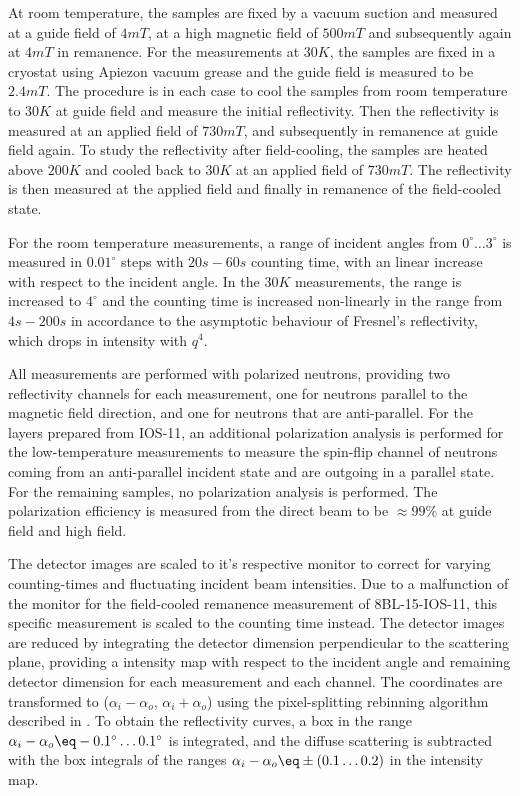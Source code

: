 \documentclass[\main/dresen_thesis.tex]{subfiles}
\begin{document}
    At room temperature, the samples are fixed by a vacuum suction and measured at a guide field of $4 \unit{mT}$, at a high magnetic field of $500 \unit{mT}$ and subsequently again at $4 \unit{mT}$ in remanence.
    For the measurements at $30 \unit{K}$, the samples are fixed in a cryostat using Apiezon vacuum grease and the guide field is measured to be $2.4 \unit{mT}$.
    The procedure is in each case to cool the samples from room temperature to $30 \unit{K}$ at guide field and measure the initial reflectivity.
    Then the reflectivity is measured at an applied field of $730 \unit{mT}$, and subsequently in remanence at guide field again.
    To study the reflectivity after field-cooling, the samples are heated above $200 \unit{K}$ and cooled back to $30 \unit{K}$ at an applied field of $730 \unit{mT}$.
    The reflectivity is then measured at the applied field and finally in remanence of the field-cooled state.

    For the room temperature measurements, a range of incident angles from $0^\circ \ldots 3 ^\circ$ is measured in $0.01 ^\circ$ steps with $20 \unit{s} - 60 \unit{s}$ counting time, with an linear increase with respect to the incident angle.
    In the $30 \unit{K}$ measurements, the range is increased to $4 ^\circ$ and the counting time is increased non-linearly in the range from $4 \unit{s} - 200 \unit{s}$ in accordance to the asymptotic behaviour of Fresnel's reflectivity, which drops in intensity with $q^4$.

    All measurements are performed with polarized neutrons, providing two reflectivity channels for each measurement, one for neutrons parallel to the magnetic field direction, and one for neutrons that are anti-parallel.
    For the layers prepared from IOS-11, an additional polarization analysis is performed for the low-temperature measurements to measure the spin-flip channel of neutrons coming from an anti-parallel incident state and are outgoing in a parallel state.
    For the remaining samples, no polarization analysis is performed.
    The polarization efficiency is measured from the direct beam to be $\approx 99 \%$ at guide field and high field.

    The detector images are scaled to it's respective monitor to correct for varying counting-times and fluctuating incident beam intensities.
    Due to a malfunction of the monitor for the field-cooled remanence measurement of 8BL-15-IOS-11, this specific measurement is scaled to the counting time instead.
    The detector images are reduced by integrating the detector dimension perpendicular to the scattering plane, providing a intensity map with respect to the incident angle and remaining detector dimension for each measurement and each channel.
    The coordinates are transformed to ($\alpha_i - \alpha_o$, $\alpha_i + \alpha_o$) using the pixel-splitting rebinning algorithm described in .
    To obtain the reflectivity curves, a box in the range $\alpha_i - \alpha_o \eq -0.1 ^\circ \ldots 0.1 ^\circ$ is integrated, and the diffuse scattering is subtracted with the box integrals of the ranges $\alpha_i - \alpha_o \eq \pm (0.1 \ldots 0.2)$ in the intensity map.
\end{document}
